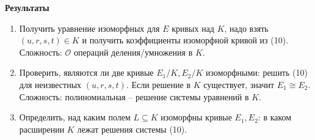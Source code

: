 \documentclass[12pt]{article}
\newcommand{\bigO}{\mathcal{O}}
\theoremstyle{definition}
\theoremstyle{definition}
\theoremstyle{definition}
\begin{document}
            \textbf{Результаты}
            \begin{enumerate}
                \item Получить уравнение изоморфных для $E$ кривых над $K$, надо взять $(u,r,s,t)\in K$ и получить коэффициенты изоморфной кривой из (10). \newline
                Сложность: $\bigO$ операций деления/умножения в $K$.
                \item Проверить, являются ли две кривые $E_1/K, E_2/K$ изоморфными: решить (10) для неизвестных $(u,r,s,t)$. Если решение в $K$ существует, значит $E_1\cong E_2$. \newline
                Сложность: полиномиальная -- решение системы уравнений в $K$.
                \item Определить, над каким полем $L \subseteq K$ изоморфны кривые $E_1, E_2$: в каком расширении $K$ лежат решения системы (10).
            \end{enumerate}
\end{document}
